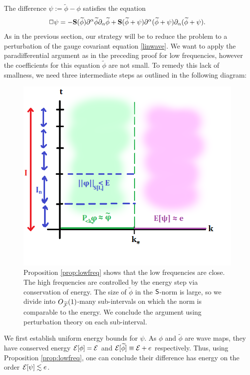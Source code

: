 The difference $\psi := \widetilde\phi -  \phi$ satisfies the equation
	\[
		\Box \psi
			= - {\bf S} (\widetilde \phi) \partial^\alpha \widetilde \phi \partial_\alpha \widetilde \phi + {\bf S} (\widetilde \phi + \psi) \partial^\alpha( \widetilde \phi + \psi) \partial_\alpha (\widetilde \phi + \psi).
	\]
As in the previous section, our strategy will be to reduce the problem to a perturbation of the gauge covariant equation	\eqref{linwave}. We want to apply the paradifferential argument as in the preceding proof for low frequencies, however the coefficients for this equation $\widetilde \phi$ are not small. To remedy this lack of smallness, we need three intermediate steps as outlined in the following diagram:

\begin{figure}[h]
	\begin{center}
		\includegraphics[scale = 0.7]{graphics/induction}
		\caption{Proposition \ref{prop:lowfreq} shows that the low frequencies are close. The high frequencies are controlled by the energy step via conservation of energy. The size of $\widetilde \phi$ in the $\mathsf S$-norm is large, so we divide into $O_{\widetilde {\mathcal F}} (1)$-many sub-intervals on which the norm is comparable to the energy. We conclude the argument using perturbation theory on each sub-interval. 
		}
	\end{center}
\end{figure}

We first establish uniform energy bounds for $\psi$. As $\phi$ and $\widetilde\phi$ are wave maps, they have conserved energy $\mathcal E[\phi] = \mathcal E$ and $\mathcal E[\widetilde \phi] \equiv \mathcal E + e$ respectively. Thus, using Proposition \ref{prop:lowfreq}, one can conclude their difference has energy on the order $\mathcal E[\psi] \lesssim e$. 

